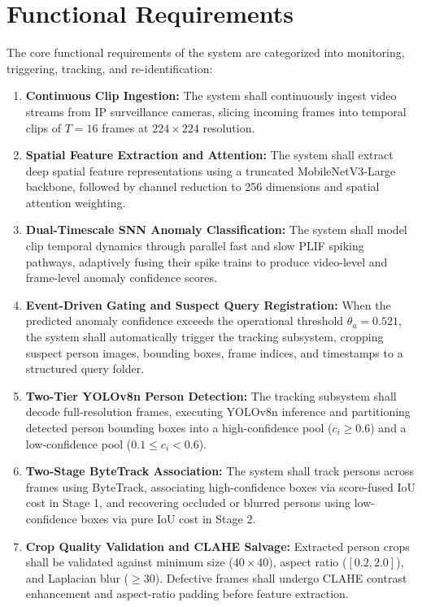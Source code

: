 \documentclass[12pt,a4paper]{report}
\begin{document}
\section{Functional Requirements}
The core functional requirements of the system are categorized into monitoring, triggering, tracking, and re-identification:

\begin{enumerate}[{FR}-1:]
    \item \textbf{Continuous Clip Ingestion:} The system shall continuously ingest video streams from IP surveillance cameras, slicing incoming frames into temporal clips of $T = 16$ frames at $224 \times 224$ resolution.
    \item \textbf{Spatial Feature Extraction and Attention:} The system shall extract deep spatial feature representations using a truncated MobileNetV3-Large backbone, followed by channel reduction to 256 dimensions and spatial attention weighting.
    \item \textbf{Dual-Timescale SNN Anomaly Classification:} The system shall model clip temporal dynamics through parallel fast and slow PLIF spiking pathways, adaptively fusing their spike trains to produce video-level and frame-level anomaly confidence scores.
    \item \textbf{Event-Driven Gating and Suspect Query Registration:} When the predicted anomaly confidence exceeds the operational threshold $\theta_a = 0.521$, the system shall automatically trigger the tracking subsystem, cropping suspect person images, bounding boxes, frame indices, and timestamps to a structured query folder.
    \item \textbf{Two-Tier YOLOv8n Person Detection:} The tracking subsystem shall decode full-resolution frames, executing YOLOv8n inference and partitioning detected person bounding boxes into a high-confidence pool ($c_i \ge 0.6$) and a low-confidence pool ($0.1 \le c_i < 0.6$).
    \item \textbf{Two-Stage ByteTrack Association:} The system shall track persons across frames using ByteTrack, associating high-confidence boxes via score-fused IoU cost in Stage 1, and recovering occluded or blurred persons using low-confidence boxes via pure IoU cost in Stage 2.
    \item \textbf{Crop Quality Validation and CLAHE Salvage:} Extracted person crops shall be validated against minimum size ($40 \times 40$), aspect ratio ($[0.2, 2.0]$), and Laplacian blur ($\ge 30$). Defective frames shall undergo CLAHE contrast enhancement and aspect-ratio padding before feature extraction.

\end{enumerate}
\end{document}
